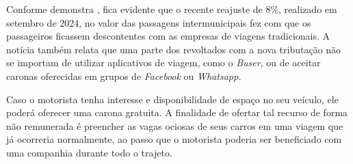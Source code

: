Conforme demonstra , fica evidente que o recente reajuste de 8\%, realizado em setembro de 2024, no valor das passagens intermunicipais fez com que os passageiros ficassem descontentes  com as empresas de viagens tradicionais. A notícia também relata que uma parte dos revoltados com a nova tributação não se importam de utilizar aplicativos de viagem, como o \textit{Buser}, ou de aceitar caronas oferecidas em grupos de \textit{Facebook} ou \textit{Whatsapp.}

Caso o motorista tenha interesse e disponibilidade de espaço no seu veículo, ele poderá oferecer uma carona gratuita. A finalidade de ofertar tal recurso de forma não remunerada é preencher as vagas ociosas de seus carros em uma viagem que já ocorreria normalmente, ao passo que o motorista poderia ser beneficiado com uma companhia durante todo o trajeto.
